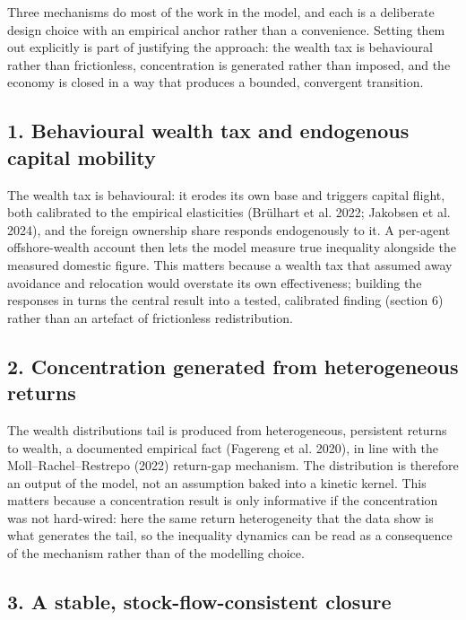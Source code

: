 \documentclass[12pt]{article}
\begin{document}
Three mechanisms do most of the work in the model, and each is a
deliberate design choice with an empirical anchor rather than a
convenience. Setting them out explicitly is part of justifying the
approach: the wealth tax is behavioural rather than frictionless,
concentration is generated rather than imposed, and the economy is
closed in a way that produces a bounded, convergent transition.

\hypertarget{behavioural-wealth-tax-and-endogenous-capital-mobility}{%
\subsection{1. Behavioural wealth tax and endogenous capital
mobility}\label{behavioural-wealth-tax-and-endogenous-capital-mobility}}

The wealth tax is behavioural: it erodes its own base and triggers
capital flight, both calibrated to the empirical elasticities (Brülhart
et al. 2022; Jakobsen et al. 2024), and the foreign ownership share
responds endogenously to it. A per-agent offshore-wealth account then
lets the model measure true inequality alongside the measured domestic
figure. This matters because a wealth tax that assumed away avoidance
and relocation would overstate its own effectiveness; building the
responses in turns the central result into a tested, calibrated finding
(section 6) rather than an artefact of frictionless redistribution.

\hypertarget{concentration-generated-from-heterogeneous-returns}{%
\subsection{2. Concentration generated from heterogeneous
returns}\label{concentration-generated-from-heterogeneous-returns}}

The wealth distribution\textquotesingle s tail is produced from
heterogeneous, persistent returns to wealth, a documented empirical fact
(Fagereng et al. 2020), in line with the Moll--Rachel--Restrepo (2022)
return-gap mechanism. The distribution is therefore an output of the
model, not an assumption baked into a kinetic kernel. This matters
because a concentration result is only informative if the concentration
was not hard-wired: here the same return heterogeneity that the data
show is what generates the tail, so the inequality dynamics can be read
as a consequence of the mechanism rather than of the modelling choice.

\hypertarget{a-stable-stock-flow-consistent-closure}{%
\subsection{3. A stable, stock-flow-consistent
closure}\label{a-stable-stock-flow-consistent-closure}}
\end{document}
